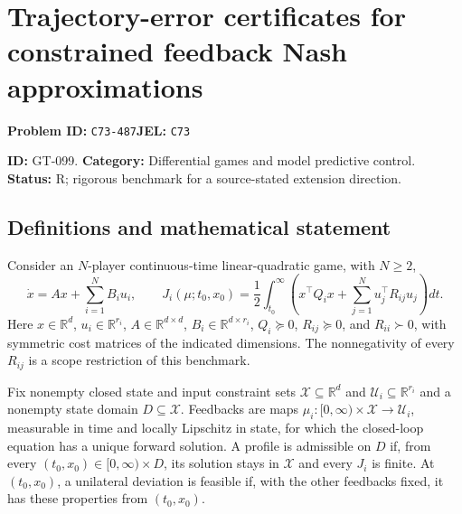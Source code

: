 \documentclass[11pt,a4paper]{article}
\begin{document}
\section*{Trajectory-error certificates for constrained feedback Nash approximations}
\textbf{Problem ID:} \texttt{C73-487}\quad \textbf{JEL:} \texttt{C73}\par
\label{problem:OP-0229}
\label{game:GT-099}
{\sffamily\small\color{muted}
\noindent\textbf{ID:} GT-099. \textbf{Category:} Differential games and model predictive control.
\textbf{Status:} R; rigorous benchmark for a source-stated extension direction.
\par}
\subsection*{Definitions and mathematical statement}
Consider an $N$-player continuous-time linear-quadratic game, with $N\geq2$,
\[
 \dot x=Ax+\sum_{i=1}^N B_i u_i,\qquad
 J_i(\mu;t_0,x_0)=\frac12\int_{t_0}^\infty
       \left(x^\top Q_i x+\sum_{j=1}^N u_j^\top R_{ij}u_j\right)dt.
\]
Here $x\in\mathbb R^d$, $u_i\in\mathbb R^{r_i}$,
$A\in\mathbb R^{d\times d}$, $B_i\in\mathbb R^{d\times r_i}$,
$Q_i\succeq0$, $R_{ij}\succeq0$, and $R_{ii}\succ0$, with symmetric cost matrices of the indicated dimensions. The nonnegativity of every $R_{ij}$ is a scope restriction of this benchmark.

Fix nonempty closed state and input constraint sets $\mathcal X\subseteq\mathbb R^d$ and $\mathcal U_i\subseteq\mathbb R^{r_i}$ and a nonempty state domain $D\subseteq\mathcal X$. Feedbacks are maps $\mu_i:[0,\infty)\times\mathcal X\to\mathcal U_i$, measurable in time and locally Lipschitz in state, for which the closed-loop equation has a unique forward solution. A profile is admissible on $D$ if, from every $(t_0,x_0)\in[0,\infty)\times D$, its solution stays in $\mathcal X$ and every $J_i$ is finite. At $(t_0,x_0)$, a unilateral deviation is feasible if, with the other feedbacks fixed, it has these properties from $(t_0,x_0)$.
\end{document}

